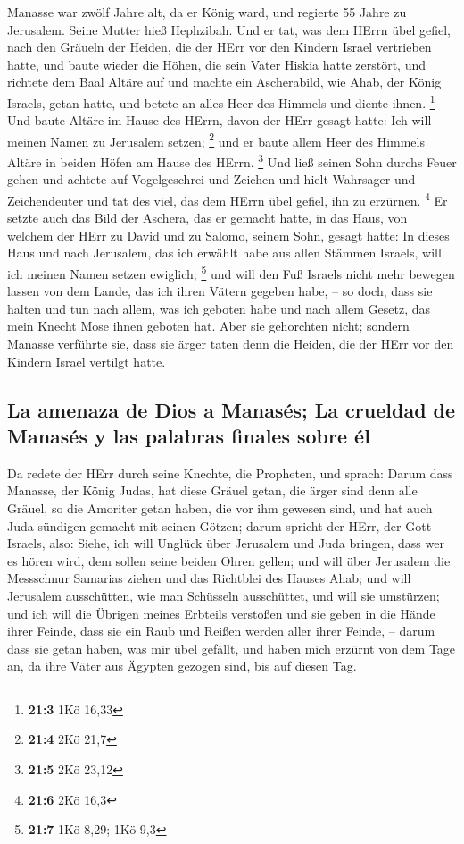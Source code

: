  Manasse war zwölf Jahre alt, da er König ward, und
regierte 55 Jahre zu Jerusalem. Seine Mutter hieß Hephzibah.
 Und er tat, was dem HErrn übel gefiel, nach den Gräueln
der Heiden, die der HErr vor den Kindern Israel vertrieben hatte,
 und baute wieder die Höhen, die sein Vater Hiskia hatte
zerstört, und richtete dem Baal Altäre auf und machte ein Ascherabild,
wie Ahab, der König Israels, getan hatte, und betete an alles Heer des
Himmels und diente ihnen. \footnote{\textbf{21:3} 1Kö 16,33}
 Und baute Altäre im Hause des HErrn, davon der HErr
gesagt hatte: Ich will meinen Namen zu Jerusalem setzen; \footnote{\textbf{21:4}
  2Kö 21,7}  und er baute allem Heer des Himmels Altäre in
beiden Höfen am Hause des HErrn. \footnote{\textbf{21:5} 2Kö 23,12}
 Und ließ seinen Sohn durchs Feuer gehen und achtete auf
Vogelgeschrei und Zeichen und hielt Wahrsager und Zeichendeuter und tat
des viel, das dem HErrn übel gefiel, ihn zu erzürnen. \footnote{\textbf{21:6}
  2Kö 16,3}  Er setzte auch das Bild der Aschera, das er
gemacht hatte, in das Haus, von welchem der HErr zu David und zu Salomo,
seinem Sohn, gesagt hatte: In dieses Haus und nach Jerusalem, das ich
erwählt habe aus allen Stämmen Israels, will ich meinen Namen setzen
ewiglich; \footnote{\textbf{21:7} 1Kö 8,29; 1Kö 9,3}  und
will den Fuß Israels nicht mehr bewegen lassen von dem Lande, das ich
ihren Vätern gegeben habe, -- so doch, dass sie halten und tun nach
allem, was ich geboten habe und nach allem Gesetz, das mein Knecht Mose
ihnen geboten hat.  Aber sie gehorchten nicht; sondern
Manasse verführte sie, dass sie ärger taten denn die Heiden, die der
HErr vor den Kindern Israel vertilgt hatte.

\hypertarget{la-amenaza-de-dios-a-manasuxe9s-la-crueldad-de-manasuxe9s-y-las-palabras-finales-sobre-uxe9l}{%
\subsection{La amenaza de Dios a Manasés; La crueldad de Manasés y las
palabras finales sobre
él}\label{la-amenaza-de-dios-a-manasuxe9s-la-crueldad-de-manasuxe9s-y-las-palabras-finales-sobre-uxe9l}}

 Da redete der HErr durch seine Knechte, die Propheten,
und sprach:  Darum dass Manasse, der König Judas, hat
diese Gräuel getan, die ärger sind denn alle Gräuel, so die Amoriter
getan haben, die vor ihm gewesen sind, und hat auch Juda sündigen
gemacht mit seinen Götzen;  darum spricht der HErr, der
Gott Israels, also: Siehe, ich will Unglück über Jerusalem und Juda
bringen, dass wer es hören wird, dem sollen seine beiden Ohren gellen;
 und will über Jerusalem die Messschnur Samarias ziehen
und das Richtblei des Hauses Ahab; und will Jerusalem ausschütten, wie
man Schüsseln ausschüttet, und will sie umstürzen;  und
ich will die Übrigen meines Erbteils verstoßen und sie geben in die
Hände ihrer Feinde, dass sie ein Raub und Reißen werden aller ihrer
Feinde, --  darum dass sie getan haben, was mir übel
gefällt, und haben mich erzürnt von dem Tage an, da ihre Väter aus
Ägypten gezogen sind, bis auf diesen Tag.

